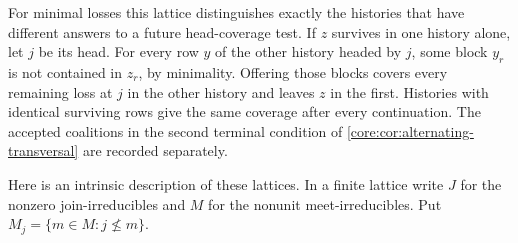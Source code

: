 For minimal losses this lattice distinguishes exactly the histories
that have different answers to a future head-coverage test. If $z$
survives in one history alone, let $j$ be its head. For every row
$y$ of the other history headed by $j$, some block $y_r$ is not
contained in $z_r$, by minimality. Offering those blocks covers
every remaining loss at $j$ in the other history and leaves $z$
in the first. Histories with identical surviving rows give the same
coverage after every continuation. The accepted coalitions in the
second terminal condition of \cref{core:cor:alternating-transversal}
are recorded separately.

Here is an intrinsic description of these lattices. In a finite
lattice write $J$ for the nonzero join-irreducibles and $M$ for the
nonunit meet-irreducibles. Put $M_j=\{m\in M:j\nleq m\}$.

